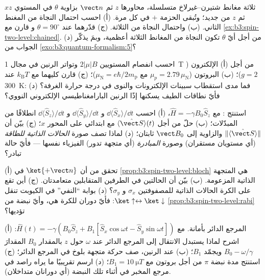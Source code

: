 \begin{exercise}[$\star$]\label{exo:b3:spin-two-level:3}
ثلاثة مغانط شتيرن--غيرلاخ متسلسلة، محاورها $z$ ثم $\vect n$ بزاوية
$\theta$ في المستوي $xz$ ثم $z$ من جديد؛ وتُبقى الحزمة $+$
في كل مرة. (أ) احسب احتمال النجاة من المغنط الثاني. (ب)
واحتمال النجاة من الثلاثة. (ج) قدّرهما عند $\theta = 90^\circ$ و
قارن مع \cref{ex:b3:spin-two-level:chained}. (د) من أجل أيّ
$\theta$ تكون النجاة من المغانط الثلاثة أعظمية، وبمَ يذكّر الجواب
من \cref{exo:b3:quantum-formalism:5}؟
\end{exercise}

\begin{exercise}[$\star$]\label{exo:b3:spin-two-level:4}
احسب انفصام المستويين $2|\mu|B$ وتواتر الرنين
في مجال \qty{1}{T} من أجل (أ) الإلكترون ($g = 2$)؛ (ب)
البروتون ($\mu_p = 2.79\,\mu_{\text{N}}$ مع $\mu_{\text{N}} =
e\hbar/2m_{\text{p}}$)؛ (ج) قارن كليهما مع $k_{\text{B}}T$ عند
\qty{300}{K}: فما مدى استقطاب سبينات الإلكترونات والنوى في درجة
حرارة الغرفة؟ (د) فأيّ نطاقات الطيف يسكنها إذًا الرنين
البارامغناطيسي الإلكتروني  النووي؟
\end{exercise}

\begin{exercise}[$\star\star$]\label{exo:b3:spin-two-level:5}
استنتج : مع $\hat H = -\gamma B_0\hat S_z$، (أ)
احسب $\dd\langle\hat S_x\rangle/\dd t$ و $\dd\langle\hat
S_y\rangle/\dd t$ و $\dd\langle\hat S_z\rangle/\dd t$ انطلاقًا من
المبدّلات؛ (ب) حلّ من أجل $\langle\hat{\vect S}\rangle(t)$ مع
 ابتدائي على المحور $x$؛ (ج) بيّن أن $\|\langle\hat{\vect S}\rangle\|$
والزاوية إلى $\vect B_0$ ثابتان؛ (د) لماذا تصف صورة
\emph{الحالات الذاتية للطاقة} (أي مستويان مستقران) وصورة
\emph{المبادرة} (أي متجهة تدور) الفيزياء نفسها ---
فأيّ حالة تبادر؟
\end{exercise}

\begin{exercise}[$\star\star$]\label{exo:b3:spin-two-level:6}
(أ) تحقق من أن $\ket{+\vect n}$ في
\cref{prop:b3:spin-two-level:bloch} هي المتجهة الذاتية المزعومة. (ب)
بيّن أن الحالتين في الطرفين المتقابلين متعامدتان. (ج) أين تقع على الكرة
الحالات الذاتية للمصفوفتين $\sigma_x$ و $\sigma_y$؟ (د) بوابة ``النفي''
في الكيوبت تنقل $\ket\uparrow \leftrightarrow \ket\downarrow$: فأيّ
دوران للكرة هي، وأيّ نبضة من
\cref{prop:b3:spin-two-level:rabi} تؤديها؟
\end{exercise}

\begin{exercise}[$\star\star$]\label{exo:b3:spin-two-level:7}
المرجع الدائر بأمانة. مع $\hat H(t) = -\gamma(B_0\hat S_z
+ B_1[\hat S_x\cos\omega t - \hat S_y\sin\omega t])$: (أ) اشرح
لماذا يستبدل الانتقال إلى المرجع الدائر عند $\omega$ حول $z$ بالمقدار
$B_0$ المقدارَ $B_0 - \omega/\gamma$ ويجمّد $B_1$؛ (ب) عند الرنين،
صف حركة متجهة بلوخ في المرجع الدائر؛ (ج)
استنتج مدة نبضة $\pi$ من أجل بروتون مع $B_1 =
\qty{10}{\micro T}$؛ (د) ارسم تقريبيًا ما يراه راصد في مرجع المخبر
في أثناء تلك النبضة (أي دورانان متداخلان).
\end{exercise}

